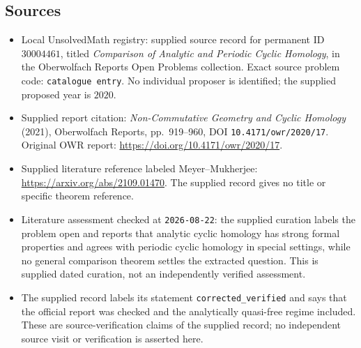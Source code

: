 \documentclass[11pt]{article}
\begin{document}
\subsection{Sources}
\begin{itemize}
\item Local UnsolvedMath registry: supplied source record for permanent ID \(30004461\), titled \emph{Comparison of Analytic and Periodic Cyclic Homology}, in the Oberwolfach Reports Open Problems collection. Exact source problem code: \texttt{catalogue entry}. No individual proposer is identified; the supplied proposed year is \(2020\).
\item Supplied report citation: \emph{Non-Commutative Geometry and Cyclic Homology} (2021), Oberwolfach Reports, pp.~919--960, DOI \texttt{10.4171/owr/2020/17}. Original OWR report: \url{https://doi.org/10.4171/owr/2020/17}.
\item Supplied literature reference labeled Meyer--Mukherjee: \url{https://arxiv.org/abs/2109.01470}. The supplied record gives no title or specific theorem reference.
\item Literature assessment checked at \texttt{2026-08-22}: the supplied curation labels the problem open and reports that analytic cyclic homology has strong formal properties and agrees with periodic cyclic homology in special settings, while no general comparison theorem settles the extracted question. This is supplied dated curation, not an independently verified assessment.
\item The supplied record labels its statement \texttt{corrected\_verified} and says that the official report was checked and the analytically quasi-free regime included. These are source-verification claims of the supplied record; no independent source visit or verification is asserted here.
\end{itemize}
\end{document}
